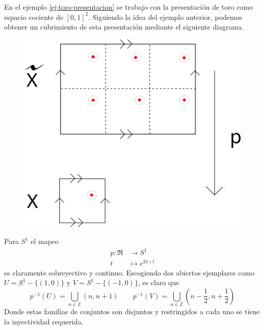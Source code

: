 \begin{ejemplo}
  En el ejemplo \ref{ej:toro-presentacion} se trabajo con la
  presentación de toro como espacio cociente de \([0,1]^2\). Siguiendo
  la idea del ejemplo anterior, podemos obtener un cubrimiento de esta
  presentación mediante el siguiente diagrama.
  \begin{figure}[h]
    \centering \includegraphics[scale=0.5]{./imagenes/toro-cubrimiento.png}
  \end{figure}
\end{ejemplo}

\begin{ejemplo}
Para \(S^1\) el mapeo
\begin{align*}
  p : \Re &\longrightarrow S^1 \\
  t &\longmapsto e^{2 \pi \imath t}
\end{align*}
es claramente
sobreyectivo y continuo. Escogiendo dos abiertos ejemplares como \(U =
S^1 - \{(1,0)\}\) y \(V = S^1 - \{(-1,0)\}\), es claro que
\[
    p^{-1} (U) = \bigcup_{n \in \mathbb Z} (n, n+1)
    \qquad p^{-1} (V) = \bigcup_{n \in \mathbb Z} (n - \frac 1 2, n + \frac 1
    2 )
\]
Donde estas familias de conjuntos son disjuntos y restringidos a cada
uno se tiene la inyectividad requerida.
\end{ejemplo}

